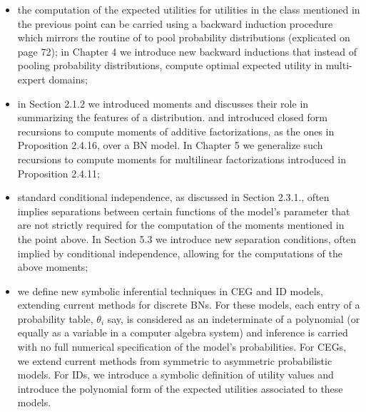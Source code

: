 \begin{itemize}
\item the computation of the expected utilities for utilities in the class mentioned in the previous point  can be carried using a backward induction procedure which mirrors the routine of \citet{Faria1997} to pool probability distributions (explicated on page 72); in Chapter 4 we introduce new backward inductions that instead of pooling probability distributions, compute optimal expected utility in multi-expert domains; 
\item in Section 2.1.2 we introduced moments and discusses their role in summarizing the features of a distribution. \citet{Cowell1999a} and \citet{Nilsson2001} introduced closed form recursions to compute moments of additive factorizations, as the ones in Proposition 2.4.16, over a BN model. In Chapter 5 we generalize such recursions to compute moments for multilinear factorizations introduced in Proposition 2.4.11;
\item standard conditional independence, as discussed in Section 2.3.1., often implies separations between certain functions of the model's parameter that are not strictly required for the computation of the  moments mentioned in the point above. In Section 5.3 we introduce new separation conditions, often implied by conditional independence, allowing for the computations of the above moments;
\item we define new symbolic inferential techniques in CEG and ID models, extending current methods for discrete BNs. For these models, each entry of a probability table, $\theta_i$ say, is considered as an indeterminate of a polynomial (or equally as a variable in a computer algebra system) and inference is carried with no full numerical specification of the model's probabilities. For CEGs, we extend current methods from symmetric to asymmetric probabilistic models. For IDs, we introduce a symbolic definition of utility values and introduce the polynomial form of the expected utilities associated to these models.   
\end{itemize}